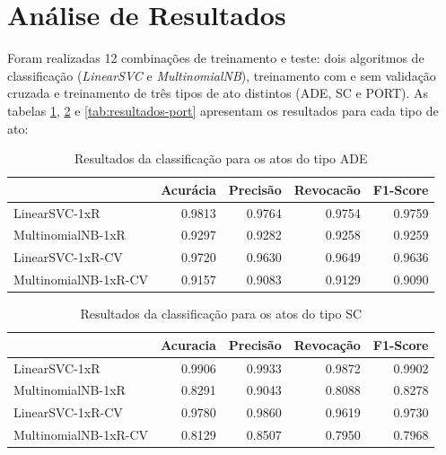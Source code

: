 \section{Análise de Resultados}

Foram realizadas 12 combinações de treinamento e teste: dois algoritmos de classificação (\textit{LinearSVC} e \textit{MultinomialNB}), treinamento com e sem validação cruzada e treinamento de três tipos de ato distintos (ADE, SC e PORT). As tabelas \ref{tab:resultados-ade}, \ref{tab:resultados-sc} e \ref{tab:resultados-port} apresentam os resultados para cada tipo de ato:

\begin{table}[h]
\caption{Resultados da classificação para os atos do tipo ADE}
\label{tab:resultados-ade}
	\begin{center}
	\begin{tabular}{lrrrr}
		\toprule
		{} &  Acurácia &  Precisão &  Revocacão &      F1-Score \\
		\midrule
		LinearSVC-1xR        &    0.9813 &    0.9764 &     0.9754 &  0.9759 \\
		MultinomialNB-1xR    &    0.9297 &    0.9282 &     0.9258 &  0.9259 \\
		LinearSVC-1xR-CV     &    0.9720 &    0.9630 &     0.9649 &  0.9636 \\
		MultinomialNB-1xR-CV &    0.9157 &    0.9083 &     0.9129 &  0.9090 \\
		\bottomrule
	\end{tabular}
	\end{center}		
\end{table}

\begin{table}[h]
\caption{Resultados da classificação para os atos do tipo SC}
\label{tab:resultados-sc}
	\begin{center}
	\begin{tabular}{lrrrr}
		\toprule
		{} &  Acuracia &  Precisão &  Revocação &      F1-Score \\
		\midrule
		LinearSVC-1xR        &    0.9906 &    0.9933 &     0.9872 &  0.9902 \\
		MultinomialNB-1xR    &    0.8291 &    0.9043 &     0.8088 &  0.8278 \\
		LinearSVC-1xR-CV     &    0.9780 &    0.9860 &     0.9619 &  0.9730 \\
		MultinomialNB-1xR-CV &    0.8129 &    0.8507 &     0.7950 &  0.7968 \\
		\bottomrule
	\end{tabular}
	\end{center}		
\end{table}

